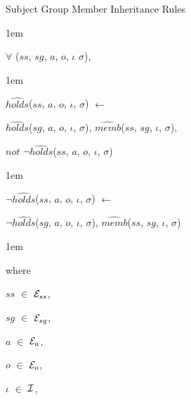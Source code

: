 \documentclass[11pt]{report}
\newenvironment{vquote}
{
  \begin{list}{}{\leftmargin 1em}\item[]
}
{
  \end{list}
}
\begin{document}
              \begin{enumerate}
                \item
                  Subject Group Member Inheritance Rules

                  \begin{vquote}
                    $\forall$ ($ss$, $sg$, $a$, $o$, $\iota$ $\sigma$),
                  \end{vquote}

                  \begin{vquote}
                    $\hat{holds}$($ss$, $a$, $o$, $\iota$, $\sigma$)
                    $\leftarrow$

                    \hspace{1em}
                    $\hat{holds}$($sg$, $a$, $o$, $\iota$, $\sigma$),
                    $\hat{memb}$($ss$, $sg$, $\iota$, $\sigma$),

                    \hspace{1em}
                    $not$ $\lnot\hat{holds}$($ss$, $a$, $o$, $\iota$, $\sigma$)
                  \end{vquote}

                  \begin{vquote}
                    $\lnot\hat{holds}$($ss$, $a$, $o$, $\iota$, $\sigma$)
                    $\leftarrow$

                    \hspace{1em}
                    $\lnot\hat{holds}$($sg$, $a$, $o$, $\iota$, $\sigma$),
                    $\hat{memb}$($ss$, $sg$, $\iota$, $\sigma$)
                  \end{vquote}

                  \begin{vquote}
                    where

                    \hspace{1em}
                    $ss$ $\in$ ${\cal E}_{ss}$,

                    \hspace{1em}
                    $sg$ $\in$ ${\cal E}_{sg}$,

                    \hspace{1em}
                    $a$ $\in$ ${\cal E}_{a}$,

                    \hspace{1em}
                    $o$ $\in$ ${\cal E}_{o}$,

                    \hspace{1em}
                    $\iota$ $\in$ ${\cal I}$,


\end{vquote}
\end{enumerate}
\end{document}
